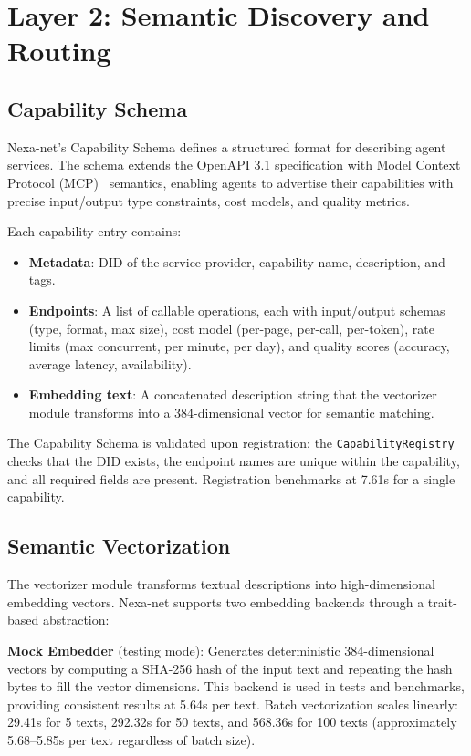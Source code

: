 \section{Layer 2: Semantic Discovery and Routing}

\subsection{Capability Schema}

Nexa-net's Capability Schema defines a structured format for describing agent services. The schema extends the OpenAPI 3.1 specification with Model Context Protocol (MCP)~\cite{mcp2024} semantics, enabling agents to advertise their capabilities with precise input/output type constraints, cost models, and quality metrics.

Each capability entry contains:

\begin{itemize}
  \item \textbf{Metadata}: DID of the service provider, capability name, description, and tags.
  \item \textbf{Endpoints}: A list of callable operations, each with input/output schemas (type, format, max size), cost model (per-page, per-call, per-token), rate limits (max concurrent, per minute, per day), and quality scores (accuracy, average latency, availability).
  \item \textbf{Embedding text}: A concatenated description string that the vectorizer module transforms into a 384-dimensional vector for semantic matching.
\end{itemize}

The Capability Schema is validated upon registration: the \texttt{CapabilityRegistry} checks that the DID exists, the endpoint names are unique within the capability, and all required fields are present. Registration benchmarks at 7.61\textmu s for a single capability.

\subsection{Semantic Vectorization}

The vectorizer module transforms textual descriptions into high-dimensional embedding vectors. Nexa-net supports two embedding backends through a trait-based abstraction:

\textbf{Mock Embedder} (testing mode): Generates deterministic 384-dimensional vectors by computing a SHA-256 hash of the input text and repeating the hash bytes to fill the vector dimensions. This backend is used in tests and benchmarks, providing consistent results at 5.64\textmu s per text. Batch vectorization scales linearly: 29.41\textmu s for 5 texts, 292.32\textmu s for 50 texts, and 568.36\textmu s for 100 texts (approximately 5.68--5.85\textmu s per text regardless of batch size).

